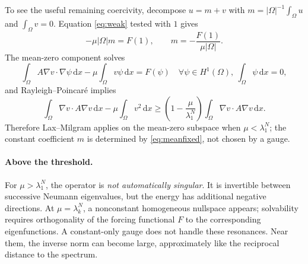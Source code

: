 \documentclass[11pt,letterpaper]{article}
\newcommand{\Om}{\Omega}
\newcommand{\dd}{\,\mathrm d}
\begin{document}
To see the useful remaining coercivity, decompose
$u=m+v$ with $m=|\Om|^{-1}\int_\Om u$ and $\int_\Om v=0$.
Equation \eqref{eq:weak} tested with $1$ gives
\begin{equation}\label{eq:meanfixed}
 -\mu|\Om|m=F(1),\qquad
 m=-\frac{F(1)}{\mu|\Om|}.
\end{equation}
The mean-zero component solves
\begin{equation}\label{eq:meansubspace}
 \int_\Om A\nabla v\cdot\nabla\psi\dd x
 -\mu\int_\Om v\psi\dd x=F(\psi)
 \quad\forall\psi\in H^1(\Om),\ \int_\Om\psi\dd x=0,
\end{equation}
and Rayleigh--Poincar\'e implies
\begin{equation}\label{eq:restrictedcoercivity}
 \int_\Om \nabla v\cdot A\nabla v\dd x-\mu\int_\Om v^2\dd x
 \ge\left(1-\frac\mu{\lambda_1^N}\right)
       \int_\Om\nabla v\cdot A\nabla v\dd x.
\end{equation}
Therefore Lax--Milgram applies on the mean-zero subspace when
$\mu<\lambda_1^N$; the constant coefficient $m$ is determined by
\eqref{eq:meanfixed}, not chosen by a gauge.

\begin{center}
\end{center}

\paragraph{Above the threshold.}
For $\mu>\lambda_1^N$, the operator is \emph{not automatically singular}.
It is invertible between successive Neumann eigenvalues, but the energy has
additional negative directions. At $\mu=\lambda_k^N$, a nonconstant
homogeneous nullspace appears; solvability requires orthogonality of the
forcing functional $F$ to the corresponding eigenfunctions. A constant-only
gauge does not handle these resonances. Near them, the inverse norm can
become large, approximately like the reciprocal distance to the spectrum.
\end{document}
